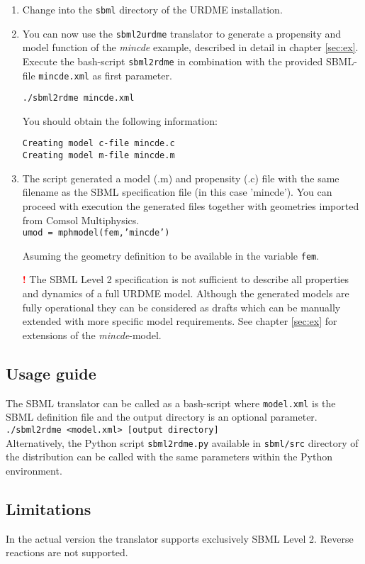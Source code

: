 \begin{enumerate}

\item Change into the \texttt{sbml} directory of the URDME installation. 

\item You can now use the \texttt{sbml2urdme} translator to generate a propensity and model function
of the \textit{mincde} example, described in detail in chapter \ref{sec:ex}.
Execute the bash-script \texttt{sbml2rdme} in combination with the provided SBML-file \texttt{mincde.xml} as first parameter.

\texttt{./sbml2rdme mincde.xml}

You should obtain the following information:

\texttt{Creating model c-file mincde.c} \\
\texttt{Creating model m-file mincde.m}

\item The script generated a model (.m) and propensity (.c) file with the same filename as the
SBML specification file (in this case 'mincde'). You can proceed with execution the generated files
together with geometries imported from Comsol Multiphysics. \\
\texttt{umod = mphmodel(fem,'mincde')}

Asuming the geometry definition to be available in the variable \texttt{fem}.

  \smallskip 
   
  {\bf \textcolor{red}{!}} The SBML Level 2 specification is not sufficient to describe all properties and dynamics
  of a full URDME model. Although the generated models are fully operational they can be considered
  as drafts which can be manually extended with more specific model requirements. See chapter \ref{sec:ex} for extensions
  of the \textit{mincde}-model.

\end{enumerate}

\subsection{Usage guide}
The SBML translator can be called as a bash-script where \texttt{model.xml} is the SBML definition file and the 
output directory is an optional parameter. \\

\texttt{./sbml2rdme <model.xml> [output directory]} \\

Alternatively, the Python script \texttt{sbml2rdme.py} available in  \texttt{sbml/src} directory of the distribution
can be called with the same parameters within the Python environment.

\subsection{Limitations}
In the actual version the translator supports exclusively SBML Level 2. Reverse reactions are not supported.
